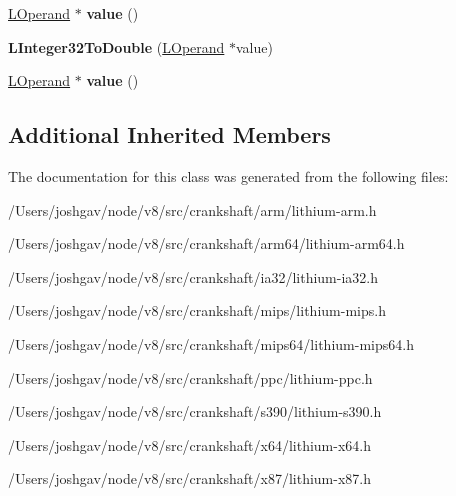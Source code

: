 \begin{DoxyCompactItemize}
\item 
\hyperlink{classv8_1_1internal_1_1_l_operand}{L\+Operand} $\ast$ {\bfseries value} ()\hypertarget{classv8_1_1internal_1_1_l_integer32_to_double_a52bea5a72f5a353e54990e9ea4aea506}{}\label{classv8_1_1internal_1_1_l_integer32_to_double_a52bea5a72f5a353e54990e9ea4aea506}

\item 
{\bfseries L\+Integer32\+To\+Double} (\hyperlink{classv8_1_1internal_1_1_l_operand}{L\+Operand} $\ast$value)\hypertarget{classv8_1_1internal_1_1_l_integer32_to_double_a9481b92a6ff468bdb5b7cdc7d1492eac}{}\label{classv8_1_1internal_1_1_l_integer32_to_double_a9481b92a6ff468bdb5b7cdc7d1492eac}

\item 
\hyperlink{classv8_1_1internal_1_1_l_operand}{L\+Operand} $\ast$ {\bfseries value} ()\hypertarget{classv8_1_1internal_1_1_l_integer32_to_double_a52bea5a72f5a353e54990e9ea4aea506}{}\label{classv8_1_1internal_1_1_l_integer32_to_double_a52bea5a72f5a353e54990e9ea4aea506}

\end{DoxyCompactItemize}
\subsection*{Additional Inherited Members}


The documentation for this class was generated from the following files\+:\begin{DoxyCompactItemize}
\item 
/\+Users/joshgav/node/v8/src/crankshaft/arm/lithium-\/arm.\+h\item 
/\+Users/joshgav/node/v8/src/crankshaft/arm64/lithium-\/arm64.\+h\item 
/\+Users/joshgav/node/v8/src/crankshaft/ia32/lithium-\/ia32.\+h\item 
/\+Users/joshgav/node/v8/src/crankshaft/mips/lithium-\/mips.\+h\item 
/\+Users/joshgav/node/v8/src/crankshaft/mips64/lithium-\/mips64.\+h\item 
/\+Users/joshgav/node/v8/src/crankshaft/ppc/lithium-\/ppc.\+h\item 
/\+Users/joshgav/node/v8/src/crankshaft/s390/lithium-\/s390.\+h\item 
/\+Users/joshgav/node/v8/src/crankshaft/x64/lithium-\/x64.\+h\item 
/\+Users/joshgav/node/v8/src/crankshaft/x87/lithium-\/x87.\+h\end{DoxyCompactItemize}
